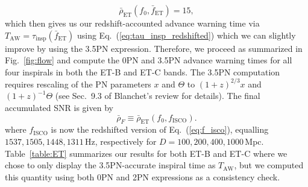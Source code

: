 \documentclass[prd,amsmath,amssymb,aps,floats,amsfonts,notitlepage,superscriptaddress,eqsecnum,nofootinbib,10pt]{revtex4-1}
\newcommand{\be}{\begin{equation}}
\newcommand{\ee}{\end{equation}}
\begin{document}
%
\be
\bar\rho_\text{ET}(f_0,\bar{f}_\text{ET}) = 15 \label{eq:ET_fbar},
\ee
%
%
which then gives us our redshift-accounted advance warning time via $T_\text{AW}=\tau_\text{insp}(\bar{f}_\text{ET})$ using Eq.~(\ref{eq:tau_insp_redshifted}) which we can slightly improve by using the 3.5PN expression. 
Therefore, we proceed as summarized in Fig.~\ref{fig:flow} and compute the 0PN and 3.5PN advance warning times 
for all four inspirals in both the ET-B and ET-C bands.
The 3.5PN computation requires rescaling of the PN parameters $x$ and $\Theta$ to $(1+z)^{2/3} x$ and $(1+z)^{-1}\Theta $ (see Sec.~9.3 of 
Blanchet's review \cite{Blanchet_LRR} for details).
The final accumulated SNR is given by
%
\be
\bar\rho_{F}\equiv \bar\rho_\text{ET}(f_0,f_\text{ISCO})  .\label{eq:rhoF_ET}
\ee
%
where $f_\text{ISCO}$ is now the redshifted version of Eq.~(\ref{eq:f_isco}), equalling $1537, 1505, 1448, 1311\,$Hz, respectively for $D=100,200,400, 1000\,$Mpc.
Table~\ref{table:ET} summarizes our results for both ET-B and ET-C where we chose to only display the 3.5PN-accurate inspiral time as $T_\text{AW}$,
but we computed this quantity using both 0PN and 2PN expressions as a consistency check.
\end{document}
